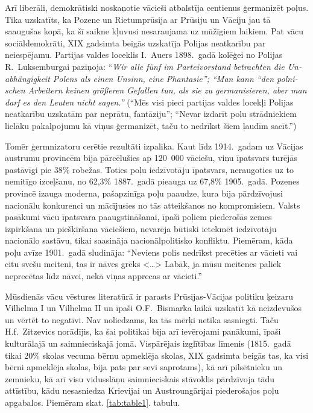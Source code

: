 \documentclass[twoside,a5paper,12pt,fleqn,openany]{extbook}
\newcommand{\detxti}[1]{\textit{\textgerman{#1}}}
\newcommand{\citespace}{<\dots{}>}
\begin{document}
Arī liberāli, demokrātiski noskaņotie vācieši atbalstīja centienus ģermanizēt poļus. Tika uzskatīts, ka Pozene un Rietumprūsija ar Prūsiju un Vāciju jau tā saaugušas kopā, ka šī saikne kļuvusi nesaraujama uz mūžīgiem laikiem. Pat vācu sociāldemokrāti, XIX gadsimta beigās uzskatīja Polijas neatkarību par neiespējamu. Partijas valdes loceklis I.~Auers 1898.~gadā kolēģei no Polijas R.~Luksemburgai paziņoja: ``\detxti{Wir alle fünf im Parteivorstand betrachten die Unabhängigkeit Polens als einen Unsinn, eine Phantasie''; ``Man kann ``den polnischen Arbeitern keinen größeren Gefallen tun, als sie zu germanisieren, aber man darf es den Leuten nicht sagen.''} (``Mēs visi pieci partijas valdes locekļi Polijas neatkarību uzskatām par neprātu, fantāziju''; ``Nevar izdarīt poļu strādniekiem lielāku pakalpojumu kā viņus ģermanizēt, taču to nedrīkst šiem ļaudīm sacīt.'')

Tomēr ģermnizatoru cerētie rezultāti izpalika. Kaut līdz 1914.~gadam uz Vācijas austrumu provincēm bija pārcēlušies ap 120~000 vāciešu, viņu īpatsvars turējās pastāvīgi pie 38\% robežas. Toties poļu iedzīvotāju īpatsvars, neraugoties uz to nemitīgo izceļšanu, no 62,3\% 1887.~gadā pieauga uz 67,8\% 1905.~gadā. Pozenes provincē izauga moderna, pašapzinīga poļu paaudze, kura bija pārdzīvojusi nacionālu konkurenci un mācījusies no tās atteikšanos no kompromisiem. Valsts pasākumi vācu īpatsvara paaugstināšanai, īpaši poļiem piederošās zemes izpirkšana un piešķiršana vāciešiem, nevarēja būtiski ietekmēt iedzīvotāju nacionālo sastāvu, tikai saasināja nacionālpolitisko konfliktu. Piemēram, kāda poļu avīze 1901.~gadā sludināja: ``Neviens polis nedrīkst precēties ar vācieti vai citu svešu meiteni, tas ir nāves grēks \citespace{} Labāk, ja mūsu meitenes paliek neprecētas līdz nāvei, nekā viņas apprecas ar vācieti.''

Mūsdienās vācu vēstures literatūrā ir parasts Prūsijas-Vācijas politiku ķeizaru Vilhelma I un Vilhelma II un īpaši O.F.~Bismarka laikā uzskatīt kā neizdevušos un vērtēt to negatīvi. Nav noliedzams, ka tās mērķi netika sasniegti. Taču H.f.~Zitzevics norādījis, ka šai politikai bija arī ievērojami panākumi, īpaši kulturālajā un saimnieciskajā jomā. Vispārējais izglītības līmenis (1815.~gadā tikai 20\% skolas vecuma bērnu apmeklēja skolas, XIX gadsimta beigās tas, ka visi bērni apmeklēja skolas, bija pats par sevi saprotams), kā arī pilsētnieku un zemnieku, kā arī visu vidusslāņu saimnieciskais stāvoklis pārdzīvoja tādu attīstību, kādu nesasniedza Krievijai un Austroungārijai piederošajos poļu apgabalos. Piemēram skat. \ref{tab:table1}. tabulu.
\end{document}
